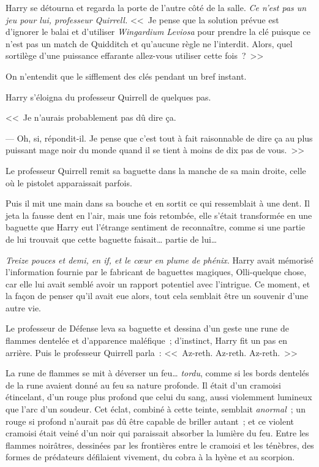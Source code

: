 Harry se détourna et regarda la porte de l'autre côté de la salle. \emph{Ce n'est pas un jeu pour lui, professeur Quirrell.} <<~Je pense que la solution prévue est d'ignorer le balai et d'utiliser \emph{Wingardium Leviosa} pour prendre la clé puisque ce n'est pas un match de Quidditch et qu'aucune règle ne l'interdit. Alors, quel sortilège d'une puissance effarante allez-vous utiliser cette fois~?~>>

On n'entendit que le sifflement des clés pendant un bref instant.

Harry s'éloigna du professeur Quirrell de quelques pas.

<<~Je n'aurais probablement pas dû dire ça.

--- Oh, si, répondit-il. Je pense que c'est tout à fait raisonnable de dire ça au plus puissant mage noir du monde quand il se tient à moins de dix pas de vous.~>>

Le professeur Quirrell remit sa baguette dans la manche de sa main droite, celle où le pistolet apparaissait parfois.

Puis il mit une main dans sa bouche et en sortit ce qui ressemblait à une dent. Il jeta la fausse dent en l'air, mais une fois retombée, elle s'était transformée en une baguette que Harry eut l'étrange sentiment de reconnaître, comme si une partie de lui trouvait que cette baguette faisait… partie de lui…

\emph{Treize pouces et demi, en if, et le cœur en plume de phénix}. Harry avait mémorisé l'information fournie par le fabricant de baguettes magiques, Olli-quelque chose, car elle lui avait semblé avoir un rapport potentiel avec l'intrigue. Ce moment, et la façon de penser qu'il avait eue alors, tout cela semblait être un souvenir d'une autre vie.

Le professeur de Défense leva sa baguette et dessina d'un geste une rune de flammes dentelée et d'apparence maléfique~; d'instinct, Harry fit un pas en arrière. Puis le professeur Quirrell parla~: <<~Az-reth. Az-reth. Az-reth.~>>

La rune de flammes se mit à déverser un feu… \emph{tordu}, comme si les bords dentelés de la rune avaient donné au feu sa nature profonde. Il était d'un cramoisi étincelant, d'un rouge plus profond que celui du sang, aussi violemment lumineux que l'arc d'un soudeur. Cet éclat, combiné à cette teinte, semblait \emph{anormal}~; un rouge si profond n'aurait pas dû être capable de briller autant~; et ce violent cramoisi était veiné d'un noir qui paraissait absorber la lumière du feu. Entre les flammes noirâtres, dessinées par les frontières entre le cramoisi et les ténèbres, des formes de prédateurs défilaient vivement, du cobra à la hyène et au scorpion.


